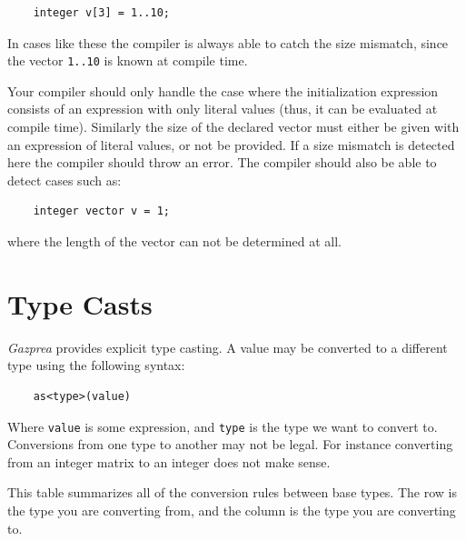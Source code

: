 \documentclass{article}
\begin{document}
  \begin{lstlisting}
    integer v[3] = 1..10;
  \end{lstlisting}

  In cases like these the compiler is always able to catch the size mismatch, since the vector \texttt{1..10} is known
  at compile time.

  Your compiler should only handle the case where the initialization expression consists of an expression with only
  literal values (thus, it can be evaluated at compile time). Similarly the size of the declared vector must either be
  given with an expression of literal values, or not be provided. If a size mismatch is detected here the compiler
  should throw an error. The compiler should also be able to detect cases such as:

  \begin{lstlisting}
    integer vector v = 1;
  \end{lstlisting}

  where the length of the vector can not be determined at all.


\section{Type Casts}\label{sec:typeCasting}

  \textit{Gazprea} provides explicit type casting. A value may be converted to a
  different type using the following syntax:

  \begin{lstlisting}
    as<type>(value)
  \end{lstlisting}

  Where \texttt{value} is some expression, and \texttt{type} is the type we want to convert to. Conversions from one
  type to another may not be legal. For instance converting from an integer matrix to an integer does not make sense.

  This table summarizes all of the conversion rules between base types. The row is the type you are converting from,
  and the column is the type you are converting to.
\end{document}
